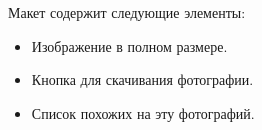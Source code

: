 Макет содержит следующие элементы:
\begin{itemize}
	\item Изображение в полном размере.
	\item Кнопка для скачивания фотографии.
	\item Список похожих на эту фотографий.
\end{itemize}
